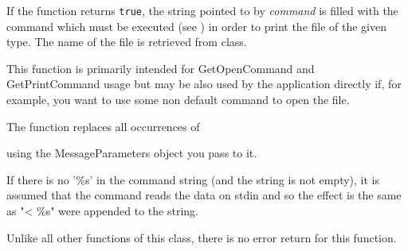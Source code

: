 
If the function returns {\tt true}, the string pointed to by {\it command} is filled
with the command which must be executed (see ) in
order to print the file of the given type. The name of the file is
retrieved from  class.

\label{wxfiletypeexpandcommand}


This function is primarily intended for GetOpenCommand and GetPrintCommand
usage but may be also used by the application directly if, for example, you want
to use some non default command to open the file.

The function replaces all occurrences of

\twocolwidtha{7cm}
\begin{twocollist}\itemsep=0pt
\end{twocollist}

using the MessageParameters object you pass to it.

If there is no '\%s' in the command string (and the string is not empty), it is
assumed that the command reads the data on stdin and so the effect is the same
as "< \%s" were appended to the string.

Unlike all other functions of this class, there is no error return for this
function.

